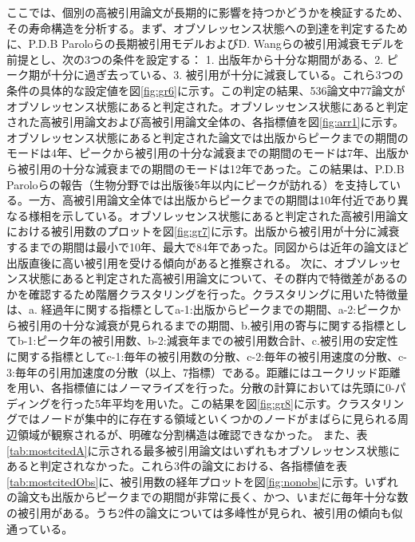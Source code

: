 ここでは、個別の高被引用論文が長期的に影響を持つかどうかを検証するため、その寿命構造を分析する。まず、オブソレッセンス状態への到達を判定するために、P.D.B Paroloら\cite{Par1}の長期被引用モデルおよびD. Wangら\cite{Wan1}の被引用減衰モデルを前提とし、次の3つの条件を設定する： 1. 出版年から十分な期間がある、2. ピーク期が十分に過ぎ去っている、3. 被引用が十分に減衰している。これら3つの条件の具体的な設定値を図\ref{fig:gr6}に示す。この判定の結果、536論文中77論文がオブソレッセンス状態にあると判定された。オブソレッセンス状態にあると判定された高被引用論文および高被引用論文全体の、各指標値を図\ref{fig:arr1}に示す。オブソレッセンス状態にあると判定された論文では出版からピークまでの期間のモードは4年、ピークから被引用の十分な減衰までの期間のモードは7年、出版から被引用の十分な減衰までの期間のモードは12年であった。この結果は、P.D.B Paroloらの報告（生物分野では出版後5年以内にピークが訪れる）を支持している。一方、高被引用論文全体では出版からピークまでの期間は10年付近であり異なる様相を示している。オブソレッセンス状態にあると判定された高被引用論文における被引用数のプロットを図\ref{fig:gr7}に示す。出版から被引用が十分に減衰するまでの期間は最小で10年、最大で84年であった。同図からは近年の論文ほど出版直後に高い被引用を受ける傾向があると推察される。
次に、オブソレッセンス状態にあると判定された高被引用論文について、その群内で特徴差があるのかを確認するため階層クラスタリングを行った。クラスタリングに用いた特徴量は、a. 経過年に関する指標としてa-1:出版からピークまでの期間、a-2:ピークから被引用の十分な減衰が見られるまでの期間、b.被引用の寄与に関する指標としてb-1:ピーク年の被引用数、b-2:減衰年までの被引用数合計、c.被引用の安定性に関する指標としてc-1:毎年の被引用数の分散、c-2:毎年の被引用速度の分散、c-3:毎年の引用加速度の分散（以上、7指標）である。距離にはユークリッド距離を用い、各指標値にはノーマライズを行った。分散の計算においては先頭に0-パディングを行った5年平均を用いた。この結果を図\ref{fig:gr8}に示す。クラスタリングではノードが集中的に存在する領域といくつかのノードがまばらに見られる周辺領域が観察されるが、明確な分割構造は確認できなかった。
また、表\ref{tab:mostcitedA}に示される最多被引用論文はいずれもオブソレッセンス状態にあると判定されなかった。これら3件の論文における、各指標値を表\ref{tab:mostcitedObs}に、被引用数の経年プロットを図\ref{fig:nonobs}に示す。いずれの論文も出版からピークまでの期間が非常に長く、かつ、いまだに毎年十分な数の被引用がある。うち2件の論文については多峰性が見られ、被引用の傾向も似通っている。
